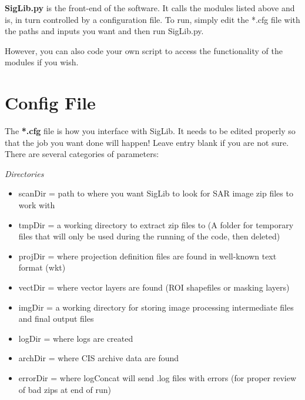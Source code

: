 \documentclass[letterpaper,10pt,openany,oneside]{sphinxmanual}
\begin{document}
\textbf{SigLib.py} is the front-end of the software. It calls the modules
listed above and is, in turn controlled by a configuration file. To run,
simply edit the *.cfg file with the paths and inputs you want and then
run SigLib.py.

However, you can also code your own script to access the functionality
of the modules if you wish.


\section{Config File}
\label{project:config-file}
The \textbf{*.cfg} file is how you interface with SigLib. It needs to be
edited properly so that the job you want done will happen! Leave entry
blank if you are not sure. There are several categories of parameters:

\emph{Directories}
\begin{itemize}
\item {} 
scanDir = path to where you want SigLib to look for SAR image zip
files to work with

\item {} 
tmpDir = a working directory to extract zip files to
(A folder for temporary files that will only be used during the
running of the code, then deleted)

\item {} 
projDir = where projection definition files are found in well-known
text format (wkt)

\item {} 
vectDir = where vector layers are found (ROI shapefiles or masking
layers)

\item {} 
imgDir = a working directory for storing image processing
intermediate files and final output files

\item {} 
logDir = where logs are created

\item {} 
archDir = where CIS archive data are found

\item {} 
errorDir = where logConcat will send .log files with errors (for
proper review of bad zips at end of run)

\end{itemize}
\end{document}
